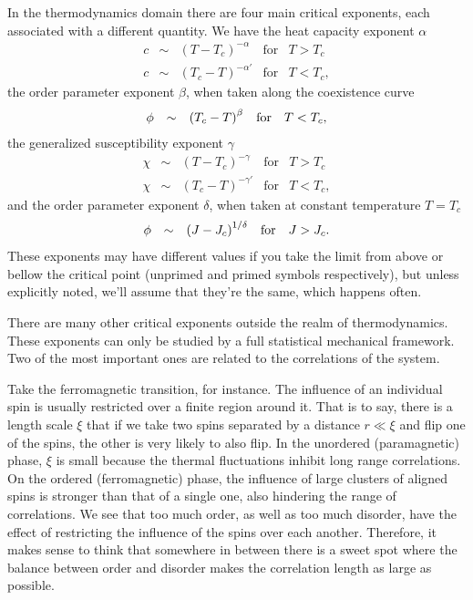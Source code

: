 In the thermodynamics domain there are four main critical exponents, each
associated with a different quantity. We have the heat capacity exponent
$\alpha$
\begin{equation}
    \label{eq:heatc}
    \begin{array}{ccccc}
        c & \sim & {\left(T-T_c\right)}^{-\alpha}  & \mbox{for} & T > T_c \\
        c & \sim & {\left(T_c-T\right)}^{-\alpha'} & \mbox{for} & T < T_c,
    \end{array}
\end{equation}
the order parameter exponent $\beta$, when taken along the coexistence curve 
\begin{equation}
    \begin{array}{ccccc}
        \phi  & \sim & {\left(T_c-T\right)}^{\beta} & \mbox{for} & T < T_c,
    \end{array}
\end{equation}
the generalized susceptibility exponent $\gamma$
\begin{equation}
    \begin{array}{ccccc}
        \chi  & \sim & {\left(T-T_c\right)}^{-\gamma}  & \mbox{for} & T > T_c \\
        \chi  & \sim & {\left(T_c-T\right)}^{-\gamma'} & \mbox{for} & T < T_c,
    \end{array}
\end{equation}
and the order parameter exponent $\delta$, when taken at constant temperature
$T=T_c$
\begin{equation}
    \begin{array}{ccccc}
        \phi  & \sim & {\left(J-J_c\right)}^{1/\delta} & \mbox{for} & J > J_c.
    \end{array}
\end{equation}
These exponents may have different values if you take the limit from above or
bellow the critical point (unprimed and primed symbols respectively), but
unless explicitly noted, we'll assume that they're the same, which happens
often.

There are many other critical exponents outside the realm of thermodynamics.
These exponents can only be studied by a full statistical mechanical framework.
Two of the most important ones are related to the correlations of the system.

Take the ferromagnetic transition, for instance. The influence of an individual
spin is usually restricted over a finite region around it. That is to say,
there is a length scale $\xi$ that if we take two spins separated by a distance
$r\ll\xi$ and flip one of the spins, the other is very likely to also flip. In
the unordered (paramagnetic) phase, $\xi$ is small because the thermal
fluctuations inhibit long range correlations. On the ordered (ferromagnetic)
phase, the influence of large clusters of aligned spins is stronger than that
of a single one, also hindering the range of correlations. We see that too
much order, as well as too much disorder, have the effect of restricting the
influence of the spins over each another. Therefore, it makes sense to think
that somewhere in between there is a sweet spot where the balance between order
and disorder makes the correlation length as large as possible.

